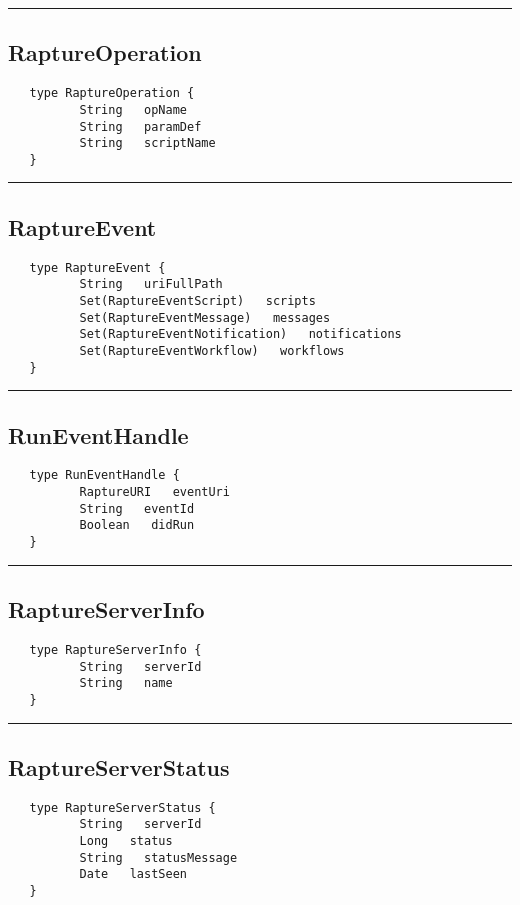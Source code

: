 \rule{15cm}{2pt}
\subsection{RaptureOperation}
\label{type:RaptureOperation}

\begin{verbatim}
   type RaptureOperation {
          String   opName
          String   paramDef
          String   scriptName
   }
\end{verbatim}

\rule{15cm}{2pt}
\subsection{RaptureEvent}
\label{type:RaptureEvent}

\begin{verbatim}
   type RaptureEvent {
          String   uriFullPath
          Set(RaptureEventScript)   scripts
          Set(RaptureEventMessage)   messages
          Set(RaptureEventNotification)   notifications
          Set(RaptureEventWorkflow)   workflows
   }
\end{verbatim}

\rule{15cm}{2pt}
\subsection{RunEventHandle}
\label{type:RunEventHandle}

\begin{verbatim}
   type RunEventHandle {
          RaptureURI   eventUri
          String   eventId
          Boolean   didRun
   }
\end{verbatim}

\rule{15cm}{2pt}
\subsection{RaptureServerInfo}
\label{type:RaptureServerInfo}

\begin{verbatim}
   type RaptureServerInfo {
          String   serverId
          String   name
   }
\end{verbatim}

\rule{15cm}{2pt}
\subsection{RaptureServerStatus}
\label{type:RaptureServerStatus}

\begin{verbatim}
   type RaptureServerStatus {
          String   serverId
          Long   status
          String   statusMessage
          Date   lastSeen
   }
\end{verbatim}

